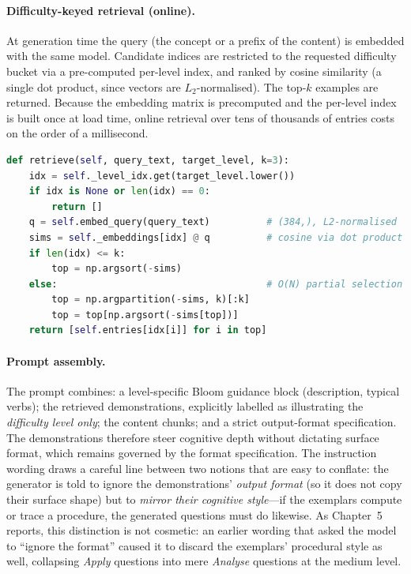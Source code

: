 \documentclass[12pt,a4paper]{report}
\begin{document}
\paragraph{Difficulty-keyed retrieval (online).}
At generation time the query (the concept or a prefix of the content) is embedded
with the same model. Candidate indices are restricted to the requested difficulty
bucket via a pre-computed per-level index, and ranked by cosine similarity
(a single dot product, since vectors are $L_2$-normalised). The top-$k$ examples
are returned. Because the embedding matrix is precomputed and the per-level index
is built once at load time, online retrieval over tens of thousands of entries
costs on the order of a millisecond.

\begin{lstlisting}[language=Python, caption={Difficulty-filtered top-$k$ cosine retrieval from the example bank.}, label={lst:retrieve}]
def retrieve(self, query_text, target_level, k=3):
    idx = self._level_idx.get(target_level.lower())
    if idx is None or len(idx) == 0:
        return []
    q = self.embed_query(query_text)          # (384,), L2-normalised
    sims = self._embeddings[idx] @ q          # cosine via dot product
    if len(idx) <= k:
        top = np.argsort(-sims)
    else:                                     # O(N) partial selection
        top = np.argpartition(-sims, k)[:k]
        top = top[np.argsort(-sims[top])]
    return [self.entries[idx[i]] for i in top]
\end{lstlisting}

\paragraph{Prompt assembly.}
The prompt combines: a level-specific Bloom guidance block (description, typical
verbs); the retrieved demonstrations, explicitly labelled as illustrating the
\emph{difficulty level only}; the content chunks; and a strict output-format
specification. The demonstrations therefore steer cognitive depth without
dictating surface format, which remains governed by the format specification.
The instruction wording draws a careful line between two notions that are easy to
conflate: the generator is told to ignore the demonstrations' \emph{output
format} (so it does not copy their surface shape) but to \emph{mirror their
cognitive style}---if the exemplars compute or trace a procedure, the generated
questions must do likewise. As Chapter~5 reports, this distinction is not
cosmetic: an earlier wording that asked the model to ``ignore the format'' caused
it to discard the exemplars' procedural style as well, collapsing \emph{Apply}
questions into mere \emph{Analyse} questions at the medium level.
\end{document}
